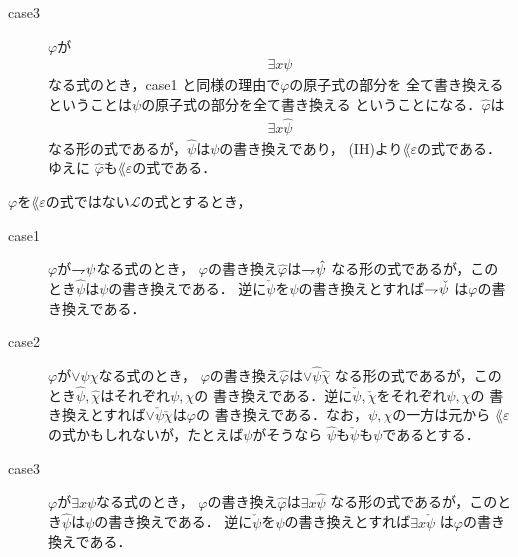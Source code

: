 \begin{metaprf}
\begin{description}
\begin{description}
					\item[case3] $\varphi$が
						\begin{align}
							\exists x \psi
						\end{align}
						なる式のとき，case1 と同様の理由で$\varphi$の原子式の部分を
						全て書き換えるということは$\psi$の原子式の部分を全て書き換える
						ということになる．$\hat{\varphi}$は
						\begin{align}
							\exists x \hat{\psi}
						\end{align}
						なる形の式であるが，$\hat{\psi}$は$\psi$の書き換えであり，
						(IH)より$\lang{\varepsilon}$の式である．ゆえに
						$\hat{\varphi}$も$\lang{\varepsilon}$の式である．
						\QED
				\end{description}
		\end{description}
	\end{metaprf}
	
	\begin{screen}
		\begin{metathm}[部分式の書き換えとの関係]
		\label{metathm:relation_to_subformula_rewriting}
			$\varphi$を$\lang{\varepsilon}$の式ではない$\mathcal{L}$の式とするとき，
			\begin{description}
				\item[case1] $\varphi$が$\rightharpoondown\hspace{-0.25em} \psi$なる式のとき，
					$\varphi$の書き換え$\hat{\varphi}$は$\rightharpoondown\hspace{-0.25em} \hat{\psi}$
					なる形の式であるが，このとき$\hat{\psi}$は$\psi$の書き換えである．
					逆に$\check{\psi}$を$\psi$の書き換えとすれば$\rightharpoondown\hspace{-0.25em} \check{\psi}$
					は$\varphi$の書き換えである．
					
				\item[case2] $\varphi$が$\vee \psi \chi$なる式のとき，
					$\varphi$の書き換え$\hat{\varphi}$は$\vee \hat{\psi} \hat{\chi}$
					なる形の式であるが，このとき$\hat{\psi},\hat{\chi}$はそれぞれ$\psi,\chi$の
					書き換えである．逆に$\check{\psi},\check{\chi}$をそれぞれ$\psi,\chi$の
					書き換えとすれば$\vee \check{\psi} \check{\chi}$は$\varphi$の
					書き換えである．なお，$\psi,\chi$の一方は元から
					$\lang{\varepsilon}$の式かもしれないが，たとえば$\psi$がそうなら
					$\hat{\psi}$も$\check{\psi}$も$\psi$であるとする．
					
				\item[case3] $\varphi$が$\exists x \psi$なる式のとき，
					$\varphi$の書き換え$\hat{\varphi}$は$\exists x \hat{\psi}$
					なる形の式であるが，このとき$\hat{\psi}$は$\psi$の書き換えである．
					逆に$\check{\psi}$を$\psi$の書き換えとすれば$\exists x \check{\psi}$
					は$\varphi$の書き換えである．
			\end{description}
		\end{metathm}
	\end{screen}
	
